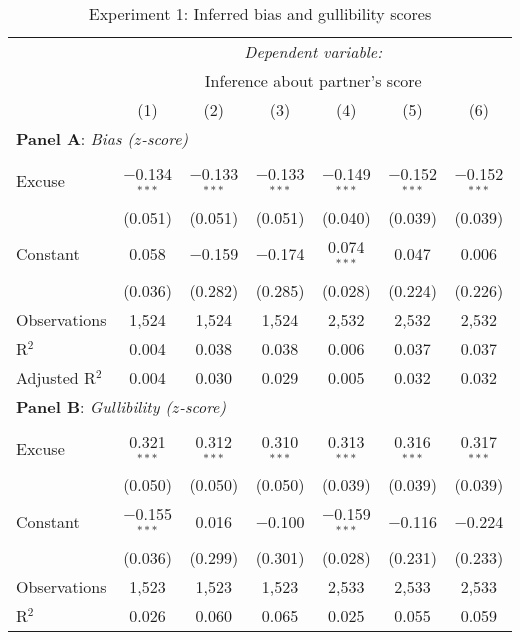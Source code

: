 \begin{table}[!htbp] \centering 
  \caption{Experiment 1: Inferred bias and gullibility scores}
  \label{t:1-score}
\begin{threeparttable}
\begin{tabular}{@{\hspace{5pt}}l@{\hspace{5pt}}cccccc} 
\toprule 
 & \multicolumn{6}{c}{\textit{Dependent variable:}} \\ 
\cmidrule(rr){2-7} 
 & \multicolumn{6}{c}{Inference about partner's score} \\ 
 & (1) & (2) & (3) & (4) & (5) & (6)\\ 
\midrule  
\midrule
\multicolumn{7}{l}{\textbf{Panel A}: \textit{Bias ($z$-score)}} \\
\midrule
\\[-2.1ex] Excuse & $-$0.134$^{***}$ & $-$0.133$^{***}$ & $-$0.133$^{***}$ & $-$0.149$^{***}$ & $-$0.152$^{***}$ & $-$0.152$^{***}$ \\ 
  & (0.051) & (0.051) & (0.051) & (0.040) & (0.039) & (0.039) \\ 
 \addlinespace 
 Constant & 0.058 & $-$0.159 & $-$0.174 & 0.074$^{***}$ & 0.047 & 0.006 \\ 
  & (0.036) & (0.282) & (0.285) & (0.028) & (0.224) & (0.226) \\ 
 \addlinespace 
\midrule  
Observations & 1,524 & 1,524 & 1,524 & 2,532 & 2,532 & 2,532 \\ 
R$^{2}$ & 0.004 & 0.038 & 0.038 & 0.006 & 0.037 & 0.037 \\ 
Adjusted R$^{2}$ & 0.004 & 0.030 & 0.029 & 0.005 & 0.032 & 0.032 \\ 
\midrule
\midrule
\multicolumn{7}{l}{\textbf{Panel B}: \textit{Gullibility ($z$-score)}} \\
\midrule
\\[-2.1ex] Excuse & 0.321$^{***}$ & 0.312$^{***}$ & 0.310$^{***}$ & 0.313$^{***}$ & 0.316$^{***}$ & 0.317$^{***}$ \\ 
  & (0.050) & (0.050) & (0.050) & (0.039) & (0.039) & (0.039) \\ 
 \addlinespace 
 Constant & $-$0.155$^{***}$ & 0.016 & $-$0.100 & $-$0.159$^{***}$ & $-$0.116 & $-$0.224 \\ 
  & (0.036) & (0.299) & (0.301) & (0.028) & (0.231) & (0.233) \\ 
 \addlinespace 
\midrule  
Observations & 1,523 & 1,523 & 1,523 & 2,533 & 2,533 & 2,533 \\ 
R$^{2}$ & 0.026 & 0.060 & 0.065 & 0.025 & 0.055 & 0.059 \\ 

\end{tabular}
\end{threeparttable}
\end{table}
